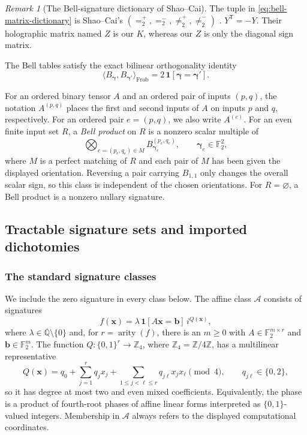 \documentclass[11pt,letterpaper,onecolumn]{article}
\theoremstyle{plain}
\theoremstyle{definition}
\theoremstyle{remark}
\newtheorem{remark}[remark]{Remark}
\newcommand{\AlgNums}{\overline{\mathbb Q}}
\newcommand{\Ftwo}{\mathbb F_2}
\newcommand{\cA}{\mathscr A}
\newcommand{\arity}{\operatorname{arity}}
\newcommand{\one}{\mathbf 1}
\begin{document}
\begin{remark}[The Bell-signature dictionary of Shao--Cai]
The tuple in \cref{eq:bell-matrix-dictionary} is Shao--Cai's
\((=^+_2,=^-_2,\neq^+_2,\neq^-_2)\) \cite[Section~2]{ShaoCai2020}.
\(Y^{\mathsf T}=-Y\).  Their holographic matrix named \(Z\) is our \(K\),
whereas our \(Z\) is only the diagonal sign matrix.
\end{remark}

The Bell tables satisfy the
exact bilinear orthogonality identity
\[
 \langle B_{\boldsymbol{\gamma}},B_{{\boldsymbol{\gamma}}'}\rangle_{\mathrm{Frob}}
 =2\,\one[{\boldsymbol{\gamma}}={\boldsymbol{\gamma}}'].
\]



For an ordered binary tensor \(A\) and an ordered pair of inputs \((p,q)\),
the notation \(A^{(p,q)}\) places the first and second inputs of \(A\) on
inputs \(p\) and \(q\), respectively. For an ordered pair \(e=(p,q)\), we also write \(A^{(e)}\). For an even finite input set \(R\), a
\emph{Bell product} on \(R\) is a nonzero scalar multiple of
\[
 \bigotimes_{e=(p_e,q_e)\in M}B_{{\boldsymbol{\gamma}}_e}^{(p_e,q_e)},
 \qquad {\boldsymbol{\gamma}}_e\in\Ftwo^2,
\]
where \(M\) is a perfect matching of \(R\) and each pair of \(M\) has been
given the displayed orientation.  Reversing a pair carrying \(B_{1,1}\)
only changes the overall scalar sign, so this class is independent of the
chosen orientations.  For \(R=\varnothing\), a Bell product is a nonzero
nullary signature.


\subsection{Tractable signature sets and imported dichotomies}
\label{sec:predicate}

\subsubsection{The standard signature classes}
\label{subsec:standard-classes}

We include the zero signature in every class below.  The affine class
\(\cA\) consists of signatures
\begin{equation}
  f({\mathbf{x}})=\lambda\,\one[A{\mathbf{x}}={\mathbf{b}}]\,i^{Q({\mathbf{x}})},
  \label{eq:affine-class}
\end{equation}
where \(\lambda\in\AlgNums\setminus\{0\}\) and, for
\(r=\arity(f)\), there is an \(m\ge0\) with
\(A\in\Ftwo^{m\times r}\) and \({\mathbf{b}}\in\Ftwo^m\).  The function
\(Q:\{0,1\}^r\to\mathbb Z_4\), where
\(\mathbb Z_4=\mathbb Z/4\mathbb Z\), has a multilinear representative
\[
 Q({\mathbf{x}})=q_0+\sum_{j=1}^r q_jx_j
      +\sum_{1\le j<\ell\le r}q_{j\ell}x_jx_\ell\pmod4,
 \qquad q_{j\ell}\in\{0,2\},
\]
so it has degree at most two and even mixed coefficients.
Equivalently, the phase is a product of fourth-root phases of affine linear
forms interpreted as \(\{0,1\}\)-valued integers.
Membership in \(\cA\) always refers to the displayed computational
coordinates.
\end{document}
